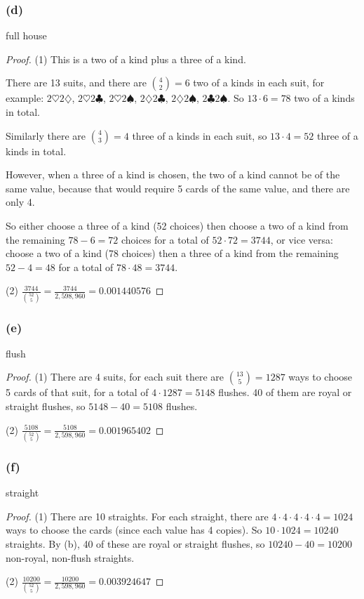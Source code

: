 \documentclass[14pt]{extarticle}
\newcommand{\dps}{\displaystyle}
\begin{document}
\subsubsection{(d)}
full house

\begin{proof}
(1) This is a two of a kind plus a three of a kind. 

There are 13 suits, and there are \(\binom{4}{2} = 6\) two of a kinds in each suit, for example: 
\(2\heartsuit 2\diamondsuit\), \(2\heartsuit 2\clubsuit\), \(2\heartsuit 2\spadesuit\), \(2\diamondsuit 2\clubsuit\), 
\(2\diamondsuit 2\spadesuit\), \(2\clubsuit 2\spadesuit\). So \(13 \cdot 6 = 78\) two of a kinds in total.

Similarly there are \(\binom{4}{3} = 4\) three of a kinds in each suit, so \(13 \cdot 4 = 52\) three of a kinds in total.

However, when a three of a kind is chosen, the two of a kind cannot be of the same value, because that would require 5 
cards of the same value, and there are only 4.

So either choose a three of a kind (52 choices) then choose a two of a kind from the remaining \(78-6=72\) choices for a
total of \(52 \cdot 72 = 3744\), or vice versa: choose a two of a kind (78 choices) then a three of a kind from the 
remaining \(52-4=48\) for a total of \(78 \cdot 48 = 3744\).

(2) \(\dps \frac{3744}{\binom{52}{5}} = \frac{3744}{2,598,960} = 0.001440576\)
\end{proof}

\subsubsection{(e)}
flush

\begin{proof}
(1) There are 4 suits, for each suit there are \(\binom{13}{5} = 1287\) ways to choose 5 cards of that suit, for a total of
\(4 \cdot 1287 = 5148\) flushes. 40 of them are royal or straight flushes, so \(5148-40 = 5108\) flushes.

(2) \(\dps \frac{5108}{\binom{52}{5}} = \frac{5108}{2,598,960} = 0.001965402\)
\end{proof}

\subsubsection{(f)}
straight

\begin{proof}
(1) There are 10 straights. For each straight, there are \(4 \cdot 4 \cdot 4 \cdot 4 \cdot 4 = 1024\) ways to choose the
cards (since each value has 4 copies). So \(10 \cdot 1024 = 10240\) straights. By (b), 40 of these are royal or straight 
flushes, so \(10240-40 = 10200\) non-royal, non-flush straights.

(2) \(\dps \frac{10200}{\binom{52}{5}} = \frac{10200}{2,598,960} = 0.003924647\)
\end{proof}
\end{document}
